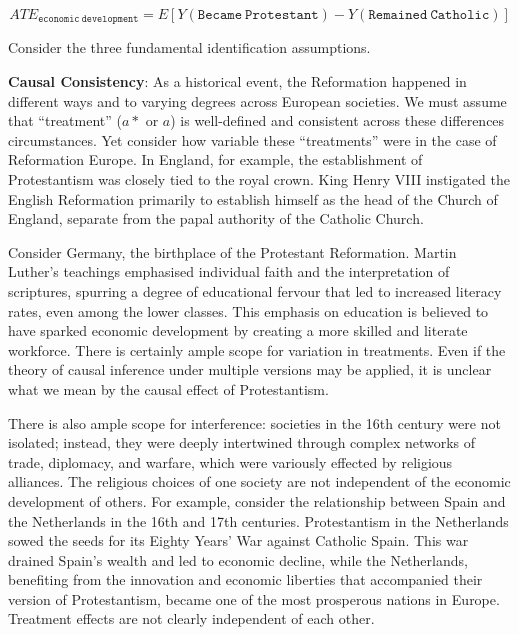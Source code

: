 \documentclass[
  singlecolumn]{report}
\begin{document}
\[ATE_{\mathtt{economic~development}} = E[Y(\mathtt{Became~Protestant}) - Y(\mathtt{Remained~Catholic})]\]

Consider the three fundamental identification assumptions.

\textbf{Causal Consistency}: As a historical event, the Reformation
happened in different ways and to varying degrees across European
societies. We must assume that ``treatment'' (\(a*\) or \(a\)) is
well-defined and consistent across these differences circumstances. Yet
consider how variable these ``treatments'' were in the case of
Reformation Europe. In England, for example, the establishment of
Protestantism was closely tied to the royal crown. King Henry VIII
instigated the English Reformation primarily to establish himself as the
head of the Church of England, separate from the papal authority of the
Catholic Church.

Consider Germany, the birthplace of the Protestant Reformation. Martin
Luther's teachings emphasised individual faith and the interpretation of
scriptures, spurring a degree of educational fervour that led to
increased literacy rates, even among the lower classes. This emphasis on
education is believed to have sparked economic development by creating a
more skilled and literate workforce. There is certainly ample scope for
variation in treatments. Even if the theory of causal inference under
multiple versions may be applied, it is unclear what we mean by the
causal effect of Protestantism.

There is also ample scope for interference: societies in the 16th
century were not isolated; instead, they were deeply intertwined through
complex networks of trade, diplomacy, and warfare, which were variously
effected by religious alliances. The religious choices of one society
are not independent of the economic development of others. For example,
consider the relationship between Spain and the Netherlands in the 16th
and 17th centuries. Protestantism in the Netherlands sowed the seeds for
its Eighty Years' War against Catholic Spain. This war drained Spain's
wealth and led to economic decline, while the Netherlands, benefiting
from the innovation and economic liberties that accompanied their
version of Protestantism, became one of the most prosperous nations in
Europe. Treatment effects are not clearly independent of each other.
\end{document}
